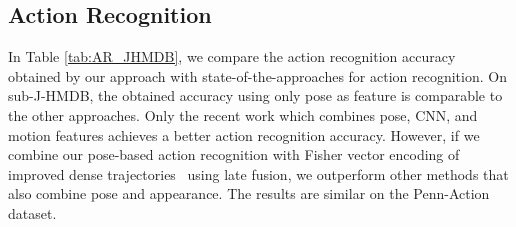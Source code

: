 \documentclass[a4paper, 10pt, conference]{ieeeconf}      \usepackage{FG2017}
\begin{document}
\begin{table*}[t]
		\footnotesize 
		\begin{center}
			\setlength{\tabcolsep}{1pt}
			\def\arraystretch{1}
			\end{center}
			\vspace{-3mm}
			\caption{Analysis of pose estimation accuracy with respect to action recognition accuracy. The values in the parentheses are the corresponding action recognition accuracies. (APK threshold: 0.1) 
		}
		\captionsetup[figure]{skip=pt}
		\label{tab:class_wise_acc}
\end{table*}

\subsection{Action Recognition} In Table \ref{tab:AR_JHMDB}, we compare the action recognition accuracy obtained by our approach with state-of-the-approaches for action recognition. On sub-J-HMDB, the obtained accuracy using only pose as feature is comparable to the other approaches. Only the recent work \cite{cheron2015p} which combines pose, CNN, and motion features achieves a better action recognition accuracy. However, if we combine our pose-based action recognition with Fisher vector encoding of improved dense trajectories~\cite{wang2013action} using late fusion, we outperform other methods that also combine pose and appearance. The results are similar on the Penn-Action dataset.
\end{document}
